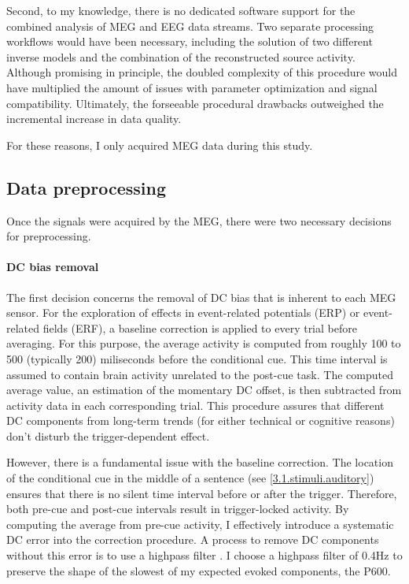 Second, to my knowledge, there is no dedicated software support for the combined analysis of MEG and EEG data streams.
Two separate processing workflows would have been necessary, including the solution of two different inverse models and the combination of the reconstructed source activity.
Although promising in principle, the doubled complexity of this procedure would have multiplied the amount of issues with parameter optimization and signal compatibility.
Ultimately, the forseeable procedural drawbacks outweighed the incremental increase in data quality.

For these reasons, I only acquired MEG data during this study.

\subsection{Data preprocessing}

Once the signals were acquired by the MEG, there were two necessary decisions for preprocessing.

\paragraph{DC bias removal}
The first decision concerns the removal of DC bias that is inherent to each MEG sensor.
For the exploration of effects in event-related potentials (ERP) or event-related fields (ERF), a baseline correction is applied to every trial before averaging.
For this purpose, the average activity is computed from roughly 100 to 500 (typically 200) miliseconds before the conditional cue.
This time interval is assumed to contain brain activity unrelated to the post-cue task.
The computed average value, an estimation of the momentary DC offset, is then subtracted from activity data in each corresponding trial.
This procedure assures that different DC components from long-term trends (for either technical or cognitive reasons) don't disturb the trigger-dependent effect.

However, there is a fundamental issue with the baseline correction.
The location of the conditional cue in the middle of a sentence (see \ref{3.1.stimuli.auditory}) ensures that there is no silent time interval before or after the trigger.
Therefore, both pre-cue and post-cue intervals result in trigger-locked activity.
By computing the average from pre-cue activity, I effectively introduce a systematic DC error into the correction procedure.
A process to remove DC components without this error is to use a highpass filter \cite{1.5.highpass}.
I choose a highpass filter of 0.4Hz to preserve the shape of the slowest of my expected evoked components, the P600.

